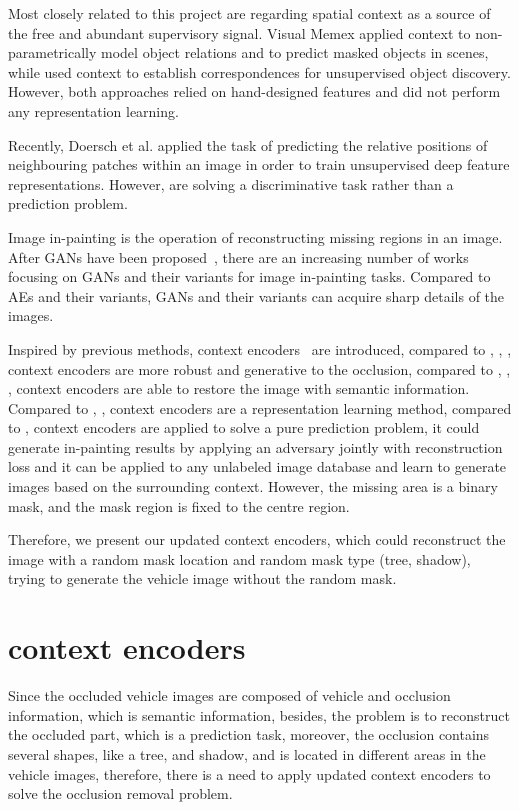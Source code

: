 Most closely related to this project are regarding spatial context as a source of the free and abundant supervisory signal. Visual Memex \cite{malisiewicz-nips09} applied context to non-parametrically model object relations and to predict masked objects in scenes, while \cite{Doersch2014} used context to establish correspondences for unsupervised object discovery. However, both approaches relied on hand-designed features and did not perform any representation learning.

Recently, Doersch et al. \cite{vrl} applied the task of predicting the relative positions of neighbouring patches within an image in order to train unsupervised deep feature representations. However, \cite{vrl} are solving a discriminative task rather than a prediction problem.

Image in-painting is the operation of reconstructing missing regions in an image. After GANs have been proposed\ \cite{NIPS2014_5ca3e9b1}, there are an increasing number of works focusing on GANs and their variants for image in-painting tasks. Compared to AEs and their variants, GANs and their variants can acquire sharp details of the images.

Inspired by previous methods, context encoders\ \cite{ce} are introduced, compared to 
\cite{Zhao2018}, \cite{Hosoi2012RestoringOR}, \cite{819578}, context encoders are more robust and generative to the occlusion, compared to
\cite{EURECOM+3712}, \cite{2a88c51341cf4974a9d5025abeb86d0d}, \cite{Sagha2017}, context encoders are able to restore the image with semantic information. Compared to \cite{malisiewicz-nips09}, \cite{Doersch2014}, context encoders are a representation learning method, compared to \cite{NIPS2014_5ca3e9b1}, context encoders are applied to solve a pure prediction problem, it could generate in-painting results by applying an adversary jointly with reconstruction loss and it can be applied to any unlabeled image database and learn to generate images based on the surrounding context. However, the missing area is a binary mask, and the mask region is fixed to the centre region.


Therefore, we present our updated context encoders, which could reconstruct the image with a random mask location and random mask type (tree, shadow), trying to generate the vehicle image without the random mask.


\section{context encoders}
Since the occluded vehicle images are composed of vehicle and occlusion information, which is semantic information, besides, the problem is to reconstruct the occluded part, which is a prediction task, moreover, the occlusion contains several shapes, like a tree, and shadow, and is located in different areas in the vehicle images, therefore, there is a need to apply updated context encoders to solve the occlusion removal problem.

